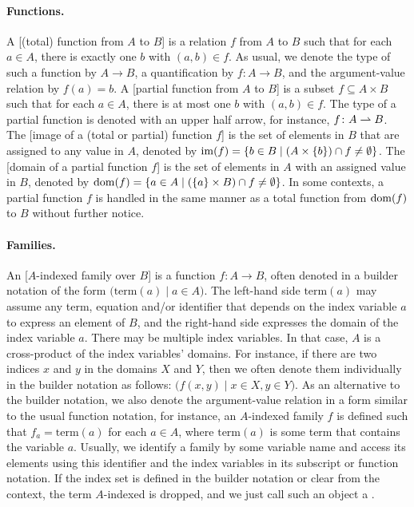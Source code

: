 \documentclass[../document.tex]{subfiles}
\begin{document}
    \paragraph{Functions.}
    A [(total) function from \(A\) to \(B\)] is a relation \(f\) from \(A\) to \(B\) such that for each \(a \in A\), there is exactly one \(b\) with \((a,b) \in f\).
    As usual, we denote the type of such a function by \(A \to B\), a quantification by \(f\colon A \to B\), and the argument-value relation by \(f(a) = b\).
    A [partial function from \(A\) to \(B\)] is a subset \(f \subseteq A \times B\) such that for each \(a \in A\), there is at most one \(b\) with \((a,b) \in f\).
    The type of a partial function is denoted with an upper half arrow, for instance, \(f\colon A \rightharpoonup B\).
    The [image of a (total or partial) function \(f\)] is the set of elements in \(B\) that are assigned to any value in \(A\), denoted by \(\operatorname{im}(f) = \{b\in B \mid (A \times \{b\}) \cap f \neq \emptyset\}\).
    The [domain of a partial function \(f\)] is the set of elements in \(A\) with an assigned value in \(B\), denoted by \(\operatorname{dom}(f) = \{a\in A \mid (\{a\} \times B) \cap f \neq \emptyset\}\).
    In some contexts, a partial function \(f\) is handled in the same manner as a total function from \(\operatorname{dom}(f)\) to \(B\) without further notice.

    \paragraph{Families.}
    An [\(A\)-indexed family over \(B\)] is a function \(f\colon A \to B\), often  denoted in a builder notation of the form \(\big(\mathrm{term}(a) \mid a \in A\big)\).
    The left-hand side \(\mathrm{term}(a)\) may assume any term, equation and/or identifier that depends on the index variable \(a\) to express an element of \(B\), and the right-hand side expresses the domain of the index variable \(a\).
    There may be multiple index variables. In that case, \(A\) is a cross-product of the index variables' domains.
    For instance, if there are two indices \(x\) and \(y\) in the domains \(X\) and \(Y\), then we often denote them individually in the builder notation as follows: \(\big( f(x,y) \mid x \in X, y \in Y \big)\).
    As an alternative to the builder notation, we also denote the argument-value relation in a form similar to the usual function notation, for instance, an \(A\)-indexed family \(f\) is defined such that \(f_a = \mathrm{term}(a)\) for each \(a \in A\), where \(\mathrm{term}(a)\) is some term that contains the variable \(a\).
    Usually, we identify a family by some variable name and access its elements using this identifier and the index variables in its subscript or function notation.
    If the index set is defined in the builder notation or clear from the context, the term \(A\)-indexed is dropped, and we just call such an object a .
\end{document}
